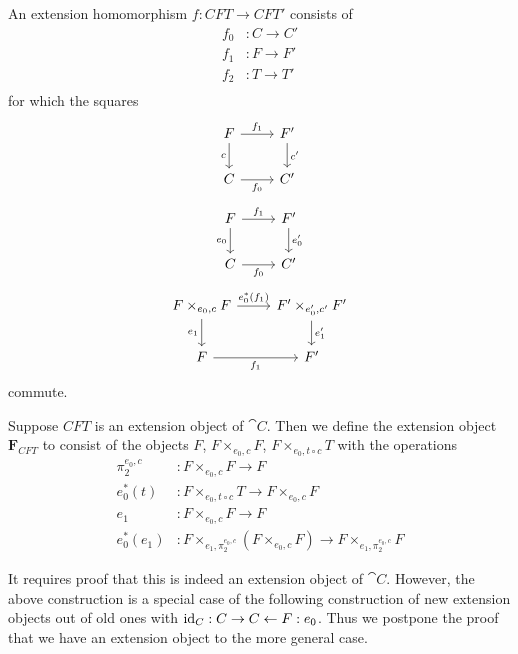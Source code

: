 \begin{defn}
An extension homomorphism $f:CFT\to CFT'$ consists of
\begin{align*}
f_0 & : C\to C'\\
f_1 & : F\to F'\\
f_2 & : T\to T'\\
\end{align*}
for which the squares
\begin{equation*}
\begin{tikzcd}
F \ar{d}[swap]{c} \ar{r}{f_1} & F' \ar{d}{c'}\\
C \ar{r}[swap]{f_0} & C'
\end{tikzcd}
\end{equation*}
\begin{equation*}
\begin{tikzcd}
F \ar{d}[swap]{e_0} \ar{r}{f_1} & F' \ar{d}{e_0'}\\
C \ar{r}[swap]{f_0} & C'
\end{tikzcd}
\end{equation*}
\begin{equation*}
\begin{tikzcd}
F\times_{e_0,c} F \ar{d}[swap]{e_1} \ar{r}{e_0^\ast(f_1)} & F'\times_{e_0',c'}F' \ar{d}{e_1'}\\
F \ar{r}[swap]{f_1} & F'
\end{tikzcd}
\end{equation*}
commute.
\end{defn}

\begin{defn}
Suppose $CFT$ is an extension object of $\cat{C}$. Then we define the extension object
$\mathbf{F}_{CFT}$ to consist of the objects $F$, $F\times_{e_0,c} F$, $F\times_{e_0,t\circ c} T$
with the operations
\begin{align*}
\pi_2^{e_0,c} & : F\times_{e_0,c} F\to F\\
e_0^\ast(t) & : F\times_{e_0,t\circ c} T\to F\times_{e_0,c} F\\
e_1 & : F\times_{e_0,c} F\to F\\
e_0^\ast(e_1) & : F\times_{e_1,\pi_2^{e_0,c}}(F\times_{e_0,c} F)\to F\times_{e_1,\pi_2^{e_0,c}} F
\end{align*}
\end{defn}

It requires proof that this is indeed an extension object of $\cat{C}$. However, the above
construction is a special case of the following construction of new extension objects out
of old ones with ${\mathrm{id}_{C}}:C\rightarrow C\leftarrow F:e_0$. Thus we postpone the proof
that we have an extension object to the more general case. 

